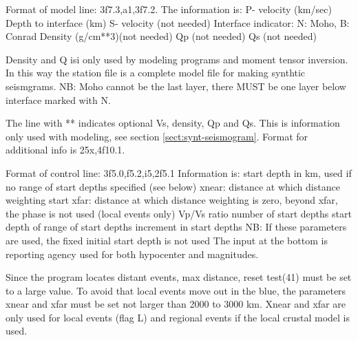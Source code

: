 \noindent
Format of model line: 3f7.3,a1,3f7.2. The information is: \newline
P- velocity (km/sec)\newline
Depth to interface (km) \newline
S- velocity (not needed) \newline
Interface indicator: N: Moho, B: Conrad
Density (g/cm**3)(not needed)  \newline
Qp (not needed) \newline
Qs (not needed) \newline 
 
Density and Q isi only used by modeling programs and moment tensor inversion. In this way the station file is a complete model file for making synthtic seismgrams.
NB: Moho cannot be the last layer, there MUST be one layer below interface marked with N.

The line with ** indicates optional Vs, density, Qp and Qs. This is information 
only used with modeling, see section \ref{sect:synt-seismogram}. Format for additional info is  25x,4f10.1. 

Format of control line: 3f5.0,f5.2,i5,2f5.1 Information is: \newline
start depth in km, used if no range of start depths specified (see below) \newline
xnear: distance at which distance weighting start 
\newline
xfar: distance at which distance weighting is zero, beyond xfar, the phase is not used (local events only) \newline
Vp/Vs ratio \newline
number of start depths \newline
start depth of range of start depths \newline
increment in start depths \newline
NB: If these parameters are used, the fixed initial start depth is not used \newline
The input at the bottom is reporting agency used for both hypocenter and magnitudes. 

Since the program locates distant events, max distance, reset test(41) must be set to a large value. To avoid that local events move out in the blue, the parameters xnear and xfar must be set not larger than 2000 to 3000 km. Xnear and xfar are only used for local events (flag L) and regional events if the local crustal model is used. 

